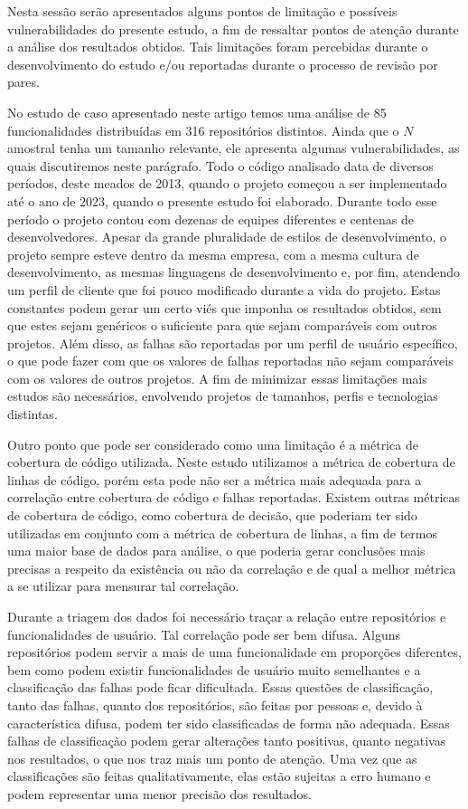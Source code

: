 \documentclass[11.5pt]{article}
\begin{document}
Nesta sessão serão apresentados alguns pontos de limitação e possíveis vulnerabilidades do presente
estudo, a fim de ressaltar pontos de atenção durante a análise dos resultados obtidos.
Tais limitações foram percebidas durante o desenvolvimento do estudo e/ou reportadas durante o
processo de revisão por pares.

No estudo de caso apresentado neste artigo temos uma análise de 85 funcionalidades distribuídas em
316 repositórios distintos.
Ainda que o $N$ amostral tenha um tamanho relevante, ele apresenta algumas vulnerabilidades, as
quais discutiremos neste parágrafo.
Todo o código analisado data de diversos períodos, deste meados de 2013, quando o projeto começou a
ser implementado até o ano de 2023, quando o presente estudo foi elaborado.
Durante todo esse período o projeto contou com dezenas de equipes diferentes e centenas de
desenvolvedores.
Apesar da grande pluralidade de estilos de desenvolvimento, o projeto sempre esteve dentro da mesma
empresa, com a mesma cultura de desenvolvimento, as mesmas linguagens de desenvolvimento e, por fim,
atendendo um perfil de cliente que foi pouco modificado durante a vida do projeto.
Estas constantes podem gerar um certo viés que imponha os resultados obtidos, sem que estes sejam
genéricos o suficiente para que sejam comparáveis com outros projetos.
Além disso, as falhas são reportadas por um perfil de usuário específico, o que pode fazer com que
os valores de falhas reportadas não sejam comparáveis com os valores de outros projetos.
A fim de minimizar essas limitações mais estudos são necessários, envolvendo projetos de tamanhos,
perfis e tecnologias distintas.

Outro ponto que pode ser considerado como uma limitação é a métrica de cobertura de código
utilizada.
Neste estudo utilizamos a métrica de cobertura de linhas de código, porém esta pode não ser a
métrica mais adequada para a correlação entre cobertura de código e falhas reportadas.
Existem outras métricas de cobertura de código, como cobertura de decisão, que poderiam ter sido
utilizadas em conjunto com a métrica de cobertura de linhas, a fim de termos uma maior base de dados
para análise, o que poderia gerar conclusões mais precisas a respeito da existência ou não da
correlação e de qual a melhor métrica a se utilizar para mensurar tal correlação.

Durante a triagem dos dados foi necessário traçar a relação entre repositórios e funcionalidades
de usuário.
Tal correlação pode ser bem difusa.
Alguns repositórios podem servir a mais de uma funcionalidade em proporções diferentes, bem como
podem existir funcionalidades de usuário muito semelhantes e a classificação das falhas pode ficar
dificultada.
Essas questões de classificação, tanto das falhas, quanto dos repositórios, são feitas por pessoas
e, devido à característica difusa, podem ter sido classificadas de forma não adequada.
Essas falhas de classificação podem gerar alterações tanto positivas, quanto negativas nos
resultados, o que nos traz mais um ponto de atenção.
Uma vez que as classificações são feitas qualitativamente, elas estão sujeitas a erro humano e podem
representar uma menor precisão dos resultados.
\end{document}
